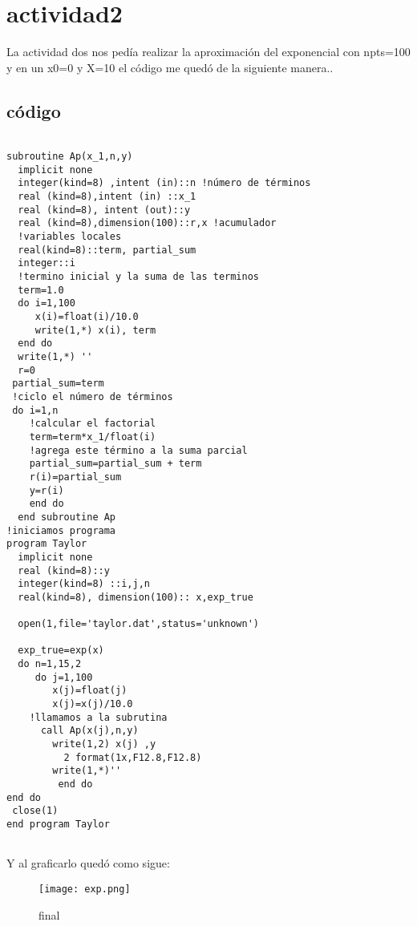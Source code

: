 \documentclass{article}
\begin{document}
\section{actividad2}
La actividad dos nos pedía realizar la aproximación del exponencial con npts=100 y en un x0=0 y X=10 el código me quedó de la siguiente manera..
\subsection{código}
\begin{verbatim}

subroutine Ap(x_1,n,y)
  implicit none
  integer(kind=8) ,intent (in)::n !número de términos
  real (kind=8),intent (in) ::x_1
  real (kind=8), intent (out)::y
  real (kind=8),dimension(100)::r,x !acumulador
  !variables locales
  real(kind=8)::term, partial_sum
  integer::i
  !termino inicial y la suma de las terminos
  term=1.0
  do i=1,100
     x(i)=float(i)/10.0
     write(1,*) x(i), term
  end do
  write(1,*) ''
  r=0
 partial_sum=term
 !ciclo el número de términos
 do i=1,n
    !calcular el factorial
    term=term*x_1/float(i)
    !agrega este término a la suma parcial
    partial_sum=partial_sum + term
    r(i)=partial_sum
    y=r(i)
    end do
  end subroutine Ap
!iniciamos programa  
program Taylor
  implicit none
  real (kind=8)::y
  integer(kind=8) ::i,j,n
  real(kind=8), dimension(100):: x,exp_true
  
  open(1,file='taylor.dat',status='unknown')
  
  exp_true=exp(x)
  do n=1,15,2
     do j=1,100
        x(j)=float(j)
        x(j)=x(j)/10.0
    !llamamos a la subrutina
      call Ap(x(j),n,y)
        write(1,2) x(j) ,y
          2 format(1x,F12.8,F12.8) 
        write(1,*)''
         end do
end do
 close(1)
end program Taylor
  
\end{verbatim}
Y al graficarlo quedó como sigue:
\begin{figure}[h!]
  \texttt{[image: exp.png]}
  \caption{final}
  \label{fig:boat1}
  \end{figure}
\end{document}

